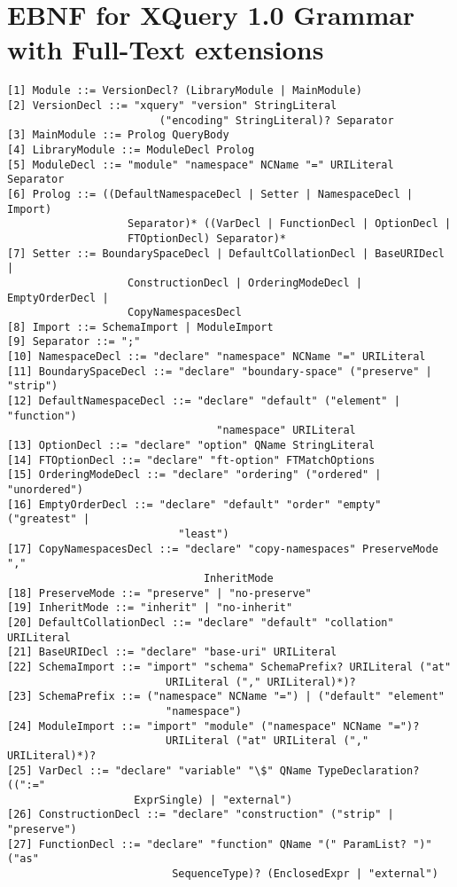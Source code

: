 \chapter{EBNF for XQuery 1.0 Grammar with Full-Text extensions}
\begin{verbatim}
[1] Module ::= VersionDecl? (LibraryModule | MainModule)
[2] VersionDecl ::= "xquery" "version" StringLiteral 
                        ("encoding" StringLiteral)? Separator
[3] MainModule ::= Prolog QueryBody
[4] LibraryModule ::= ModuleDecl Prolog
[5] ModuleDecl ::= "module" "namespace" NCName "=" URILiteral Separator
[6] Prolog ::= ((DefaultNamespaceDecl | Setter | NamespaceDecl | Import)
                   Separator)* ((VarDecl | FunctionDecl | OptionDecl |
                   FTOptionDecl) Separator)*
[7] Setter ::= BoundarySpaceDecl | DefaultCollationDecl | BaseURIDecl |
                   ConstructionDecl | OrderingModeDecl | EmptyOrderDecl |
                   CopyNamespacesDecl 
[8] Import ::= SchemaImport | ModuleImport 
[9] Separator ::= ";"
[10] NamespaceDecl ::= "declare" "namespace" NCName "=" URILiteral
[11] BoundarySpaceDecl ::= "declare" "boundary-space" ("preserve" | "strip")
[12] DefaultNamespaceDecl ::= "declare" "default" ("element" | "function")
                                 "namespace" URILiteral
[13] OptionDecl ::= "declare" "option" QName StringLiteral
[14] FTOptionDecl ::= "declare" "ft-option" FTMatchOptions
[15] OrderingModeDecl ::= "declare" "ordering" ("ordered" | "unordered")
[16] EmptyOrderDecl ::= "declare" "default" "order" "empty" ("greatest" |
                           "least")
[17] CopyNamespacesDecl ::= "declare" "copy-namespaces" PreserveMode ","
                               InheritMode 
[18] PreserveMode ::= "preserve" | "no-preserve" 
[19] InheritMode ::= "inherit" | "no-inherit"
[20] DefaultCollationDecl ::= "declare" "default" "collation" URILiteral
[21] BaseURIDecl ::= "declare" "base-uri" URILiteral
[22] SchemaImport ::= "import" "schema" SchemaPrefix? URILiteral ("at"
                         URILiteral ("," URILiteral)*)?
[23] SchemaPrefix ::= ("namespace" NCName "=") | ("default" "element"
                         "namespace")
[24] ModuleImport ::= "import" "module" ("namespace" NCName "=")?
                         URILiteral ("at" URILiteral ("," URILiteral)*)?
[25] VarDecl ::= "declare" "variable" "\$" QName TypeDeclaration? ((":="
                    ExprSingle) | "external")
[26] ConstructionDecl ::= "declare" "construction" ("strip" | "preserve")
[27] FunctionDecl ::= "declare" "function" QName "(" ParamList? ")" ("as"
                          SequenceType)? (EnclosedExpr | "external")

\end{verbatim}
